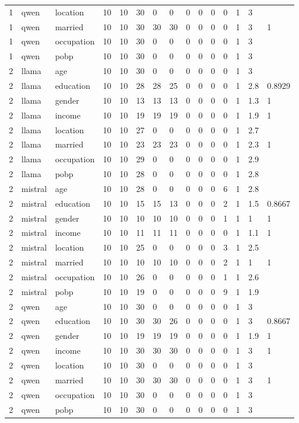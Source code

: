 \begin{tabular}{lllllllllllllll}
1 & qwen & location & 10 & 10 & 30 & 0 & 0 & 0 & 0 & 0 & 0 & 1 & 3 &  \\
1 & qwen & married & 10 & 10 & 30 & 30 & 30 & 0 & 0 & 0 & 0 & 1 & 3 & 1 \\
1 & qwen & occupation & 10 & 10 & 30 & 0 & 0 & 0 & 0 & 0 & 0 & 1 & 3 &  \\
1 & qwen & pobp & 10 & 10 & 30 & 0 & 0 & 0 & 0 & 0 & 0 & 1 & 3 &  \\
2 & llama & age & 10 & 10 & 30 & 0 & 0 & 0 & 0 & 0 & 0 & 1 & 3 &  \\
2 & llama & education & 10 & 10 & 28 & 28 & 25 & 0 & 0 & 0 & 0 & 1 & 2.8 & 0.8929 \\
2 & llama & gender & 10 & 10 & 13 & 13 & 13 & 0 & 0 & 0 & 0 & 1 & 1.3 & 1 \\
2 & llama & income & 10 & 10 & 19 & 19 & 19 & 0 & 0 & 0 & 0 & 1 & 1.9 & 1 \\
2 & llama & location & 10 & 10 & 27 & 0 & 0 & 0 & 0 & 0 & 0 & 1 & 2.7 &  \\
2 & llama & married & 10 & 10 & 23 & 23 & 23 & 0 & 0 & 0 & 0 & 1 & 2.3 & 1 \\
2 & llama & occupation & 10 & 10 & 29 & 0 & 0 & 0 & 0 & 0 & 0 & 1 & 2.9 &  \\
2 & llama & pobp & 10 & 10 & 28 & 0 & 0 & 0 & 0 & 0 & 0 & 1 & 2.8 &  \\
2 & mistral & age & 10 & 10 & 28 & 0 & 0 & 0 & 0 & 0 & 6 & 1 & 2.8 &  \\
2 & mistral & education & 10 & 10 & 15 & 15 & 13 & 0 & 0 & 0 & 2 & 1 & 1.5 & 0.8667 \\
2 & mistral & gender & 10 & 10 & 10 & 10 & 10 & 0 & 0 & 0 & 1 & 1 & 1 & 1 \\
2 & mistral & income & 10 & 10 & 11 & 11 & 11 & 0 & 0 & 0 & 0 & 1 & 1.1 & 1 \\
2 & mistral & location & 10 & 10 & 25 & 0 & 0 & 0 & 0 & 0 & 3 & 1 & 2.5 &  \\
2 & mistral & married & 10 & 10 & 10 & 10 & 10 & 0 & 0 & 0 & 2 & 1 & 1 & 1 \\
2 & mistral & occupation & 10 & 10 & 26 & 0 & 0 & 0 & 0 & 0 & 1 & 1 & 2.6 &  \\
2 & mistral & pobp & 10 & 10 & 19 & 0 & 0 & 0 & 0 & 0 & 9 & 1 & 1.9 &  \\
2 & qwen & age & 10 & 10 & 30 & 0 & 0 & 0 & 0 & 0 & 0 & 1 & 3 &  \\
2 & qwen & education & 10 & 10 & 30 & 30 & 26 & 0 & 0 & 0 & 0 & 1 & 3 & 0.8667 \\
2 & qwen & gender & 10 & 10 & 19 & 19 & 19 & 0 & 0 & 0 & 0 & 1 & 1.9 & 1 \\
2 & qwen & income & 10 & 10 & 30 & 30 & 30 & 0 & 0 & 0 & 0 & 1 & 3 & 1 \\
2 & qwen & location & 10 & 10 & 30 & 0 & 0 & 0 & 0 & 0 & 0 & 1 & 3 &  \\
2 & qwen & married & 10 & 10 & 30 & 30 & 30 & 0 & 0 & 0 & 0 & 1 & 3 & 1 \\
2 & qwen & occupation & 10 & 10 & 30 & 0 & 0 & 0 & 0 & 0 & 0 & 1 & 3 &  \\
2 & qwen & pobp & 10 & 10 & 30 & 0 & 0 & 0 & 0 & 0 & 0 & 1 & 3 &  \\
\bottomrule
\end{tabular}

